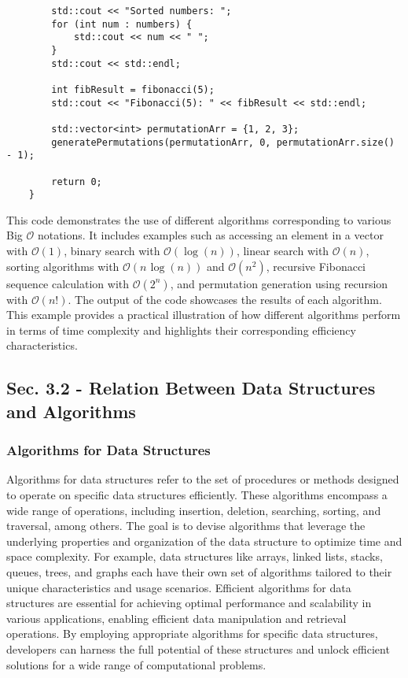 \begin{solution}
\begin{verbatim}
        std::cout << "Sorted numbers: ";
        for (int num : numbers) {
            std::cout << num << " ";
        }
        std::cout << std::endl;

        int fibResult = fibonacci(5);
        std::cout << "Fibonacci(5): " << fibResult << std::endl;

        std::vector<int> permutationArr = {1, 2, 3};
        generatePermutations(permutationArr, 0, permutationArr.size() - 1);

        return 0;
    }
    \end{verbatim}
    \horizontalline

    \noindent This code demonstrates the use of different algorithms corresponding to various Big $\mathcal{O}$ notations. It includes examples such as accessing an element in a vector with $\mathcal{O}(1)$, binary search with $\mathcal{O}(\log{(n)})$, linear search with $\mathcal{O}(n)$, sorting algorithms with $\mathcal{O}(n\hspace{1pt}\log{(n)})$ and $\mathcal{O}(n^2)$, recursive Fibonacci sequence calculation with $\mathcal{O}(2^n)$, 
    and permutation generation using recursion with $\mathcal{O}(n!)$. The output of the code showcases the results of each algorithm. This example provides a practical illustration of how different algorithms perform in terms of time complexity and highlights their corresponding efficiency characteristics.
\end{solution}

\subsection*{Sec. 3.2 - Relation Between Data Structures and Algorithms}
\subsubsection*{Algorithms for Data Structures}

Algorithms for data structures refer to the set of procedures or methods designed to operate on specific data structures efficiently. These algorithms encompass a wide range of operations, including insertion, deletion, searching, sorting, and traversal, among others. The goal is to devise algorithms that leverage the underlying properties and organization of the data structure to optimize time and space complexity. For example, data structures 
like arrays, linked lists, stacks, queues, trees, and graphs each have their own set of algorithms tailored to their unique characteristics and usage scenarios. Efficient algorithms for data structures are essential for achieving optimal performance and scalability in various applications, enabling efficient data manipulation and retrieval operations. By employing appropriate algorithms for specific data structures, developers can harness the 
full potential of these structures and unlock efficient solutions for a wide range of computational problems.


